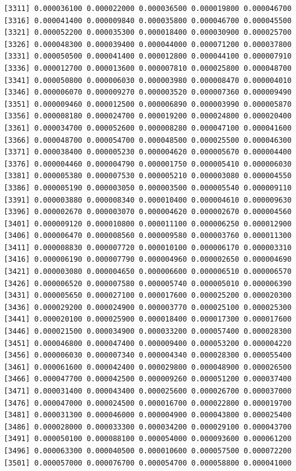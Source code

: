 \documentclass[]{article}
\begin{document}
\begin{verbatim}
 [3311] 0.000036100 0.000022000 0.000036500 0.000019800 0.000046700
 [3316] 0.000041400 0.000009840 0.000035800 0.000046700 0.000045500
 [3321] 0.000052200 0.000035300 0.000018400 0.000030900 0.000025700
 [3326] 0.000048300 0.000039400 0.000044000 0.000071200 0.000037800
 [3331] 0.000050500 0.000041400 0.000012800 0.000044100 0.000007910
 [3336] 0.000012700 0.000013600 0.000007810 0.000025800 0.000048700
 [3341] 0.000050800 0.000006030 0.000003980 0.000008470 0.000004010
 [3346] 0.000006070 0.000009270 0.000003520 0.000007360 0.000009490
 [3351] 0.000009460 0.000012500 0.000006890 0.000003990 0.000005870
 [3356] 0.000008180 0.000024700 0.000019200 0.000024800 0.000020400
 [3361] 0.000034700 0.000052600 0.000008280 0.000047100 0.000041600
 [3366] 0.000048700 0.000054700 0.000048500 0.000025500 0.000046300
 [3371] 0.000038400 0.000005230 0.000004620 0.000005670 0.000004400
 [3376] 0.000004460 0.000004790 0.000001750 0.000005410 0.000006030
 [3381] 0.000005380 0.000007530 0.000005210 0.000003080 0.000004550
 [3386] 0.000005190 0.000003050 0.000003500 0.000005540 0.000009110
 [3391] 0.000003880 0.000008340 0.000010400 0.000004610 0.000009630
 [3396] 0.000002670 0.000003070 0.000004620 0.000002670 0.000004560
 [3401] 0.000009120 0.000010800 0.000011100 0.000006250 0.000012900
 [3406] 0.000006470 0.000008560 0.000009580 0.000003760 0.000011300
 [3411] 0.000008830 0.000007720 0.000010100 0.000006170 0.000003310
 [3416] 0.000006190 0.000007790 0.000004960 0.000002650 0.000004690
 [3421] 0.000003080 0.000004650 0.000006600 0.000006510 0.000006570
 [3426] 0.000006520 0.000007580 0.000005740 0.000005010 0.000006390
 [3431] 0.000005650 0.000027100 0.000017600 0.000025200 0.000020300
 [3436] 0.000029200 0.000024900 0.000003770 0.000025100 0.000025300
 [3441] 0.000020100 0.000025900 0.000018400 0.000017300 0.000017600
 [3446] 0.000021500 0.000034900 0.000033200 0.000057400 0.000028300
 [3451] 0.000046800 0.000047400 0.000009400 0.000053200 0.000004220
 [3456] 0.000006030 0.000007340 0.000004340 0.000028300 0.000055400
 [3461] 0.000061600 0.000042400 0.000029800 0.000048900 0.000026500
 [3466] 0.000047700 0.000042500 0.000009260 0.000051200 0.000037400
 [3471] 0.000031400 0.000043400 0.000025600 0.000026700 0.000037000
 [3476] 0.000047000 0.000024500 0.000016700 0.000022800 0.000019700
 [3481] 0.000031300 0.000046000 0.000004900 0.000043800 0.000025400
 [3486] 0.000028000 0.000033300 0.000034200 0.000029100 0.000043700
 [3491] 0.000050100 0.000088100 0.000054000 0.000093600 0.000061200
 [3496] 0.000063300 0.000040500 0.000010600 0.000057500 0.000072200
 [3501] 0.000057000 0.000076700 0.000054700 0.000058800 0.000041000

\end{verbatim}
\end{document}
